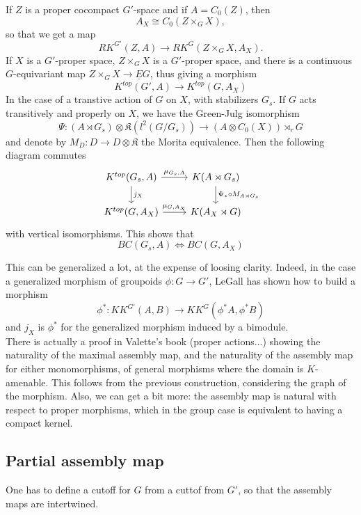 If $Z$ is a proper cocompact $G'$-space and if $A=C_0(Z)$, then 
\[A_X \cong C_0(Z\times_G X ),\]
so that we get a map
\[RK^{G'}(Z, A) \rightarrow RK^G(Z\times_G X,A_X).\]
If $X$ is a $G'$-proper space, $Z\times_G X$ is a $G'$-proper space, and there is a continuous $G$-equivariant map $Z\times_G X \rightarrow \underline E G$, thus giving a morphism
\[ K^{top}(G',A) \rightarrow K^{top}(G,A_X)  \]
In the case of a transtive action of $G$ on $X$, with stabilizers $G_s$. If $G$ acts transitively and properly on $X$, we have the Green-Julg isomorphism 
\[\Psi :(A\rtimes G_s)\otimes \mathfrak K(l^2(G/G_s))\rightarrow  (A\otimes C_0(X)) \rtimes_r G \]
and denote by $M_D: D\rightarrow D\otimes \mathfrak K$ the Morita equivalence. Then the following diagram commutes
\[\begin{tikzcd}
K^{top}(G_s, A) \arrow{d}{j_X} \arrow{r}{\mu_{G_s,A}} & K(A\rtimes G_s) \arrow{d}{\Psi_* \circ M_{A\rtimes G_s}}\\ 
K^{top}(G,A_X)\arrow{r}{\mu_{G,A_X}} & K(A_X\rtimes G)
\end{tikzcd}\]
with vertical isomorphisms. This shows that 
\[BC(G_s, A) \iff BC(G,A_X)\] 

This can be generalized a lot, at the expense of loosing clarity. Indeed, in the case a generalized morphism of groupoids $\phi : G \rightarrow G'$, LeGall has shown \cite{} how to build a morphism
\[\phi^* : KK^{G'}(A,B) \rightarrow KK^G(\phi^* A, \phi^* B)\] 
and $j_X$ is $\phi^*$ for the generalized morphism induced by a bimodule. \\

There is actually a proof in Valette's book (proper actions...) showing the naturality of the maximal assembly map, and the naturality of the assembly map for either monomorphisms, of general morphisms where the domain is $K$-amenable. This follows from the previous construction, considering the graph of the morphism. Also, we can get a bit more: the assembly map is natural with respect to proper morphisms, which in the group case is equivalent to having a compact kernel.\\

\subsection{Partial assembly map}

One has to define a cutoff for $G$ from a cuttof from $G'$, so that the assembly maps are intertwined.\\

